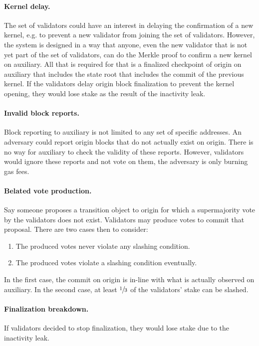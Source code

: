 \documentclass[12pt,a4paper]{article}
\begin{document}
\paragraph{Kernel delay.}
The set of validators could have an interest in delaying the confirmation of a new kernel, e.g. to prevent a new validator from joining the set of validators.
However, the system is designed in a way that anyone, even the new validator that is not yet part of the set of validators, can do the Merkle proof to confirm a new kernel on auxiliary.
All that is required for that is a finalized checkpoint of origin on auxiliary that includes the state root that includes the commit of the previous kernel.
If the validators delay origin block finalization to prevent the kernel opening, they would lose stake as the result of the inactivity leak.

\paragraph{Invalid block reports.}
Block reporting to auxiliary is not limited to any set of specific addresses.
An adversary could report origin blocks that do not actually exist on origin.
There is no way for auxiliary to check the validity of these reports.
However, validators would ignore these reports and not vote on them, the adversary is only burning gas fees.

\paragraph{Belated vote production.}
Say someone proposes a transition object to origin for which a supermajority vote by the validators does not exist.
Validators may produce votes to commit that proposal.
There are two cases then to consider:

\begin{enumerate}
    \item The produced votes never violate any slashing condition.
    \item The produced votes violate a slashing condition eventually.
\end{enumerate}

In the first case, the commit on origin is in-line with what is actually observed on auxiliary.
In the second case, at least $\sfrac{1}{3}$ of the validators' stake can be slashed.

\paragraph{Finalization breakdown.}
If validators decided to stop finalization, they would lose stake due to the inactivity leak.
\end{document}
